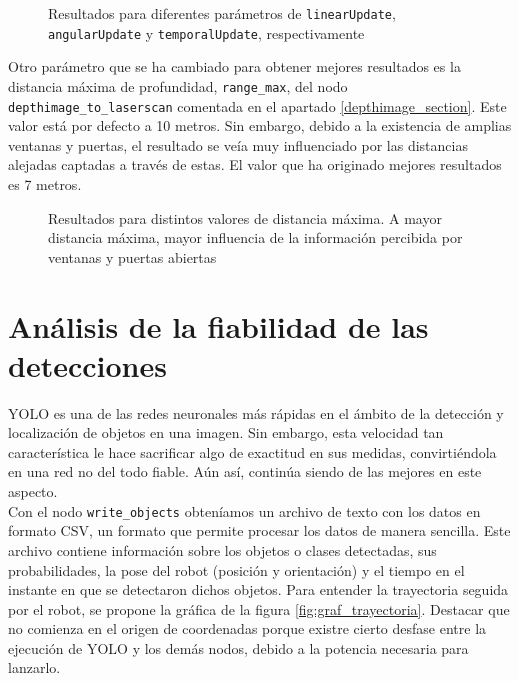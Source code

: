 \begin{figure}[H]
 \centering
 \caption{Resultados para diferentes parámetros de \texttt{linearUpdate}, \texttt{angularUpdate} y \texttt{temporalUpdate}, respectivamente}
 \label{fig:scans_params}
\end{figure}

Otro parámetro que se ha cambiado para obtener mejores resultados es la distancia máxima de profundidad, \texttt{range\_max}, del nodo \texttt{depthimage\_to\_laserscan} comentada en el apartado \ref{depthimage_section}. Este valor está por defecto a 10 metros. Sin embargo, debido a la existencia de amplias ventanas y puertas, el resultado se veía muy influenciado por las distancias alejadas captadas a través de estas. El valor que ha originado mejores resultados es 7 metros.\\

\begin{figure}[H]
 \centering
 \caption{Resultados para distintos valores de distancia máxima. A mayor distancia máxima, mayor influencia de la información percibida por ventanas y puertas abiertas}
 \label{fig:scans_range}
\end{figure}


\section{Análisis de la fiabilidad de las detecciones}

YOLO es una de las redes neuronales más rápidas en el ámbito de la detección y localización de objetos en una imagen. Sin embargo, esta velocidad tan característica le hace sacrificar algo de exactitud en sus medidas, convirtiéndola en una red no del todo fiable. Aún así, continúa siendo de las mejores en este aspecto.\\

Con el nodo \texttt{write\_objects} obteníamos un archivo de texto con los datos en formato CSV, un formato que permite procesar los datos de manera sencilla. Este archivo contiene información sobre los objetos o clases detectadas, sus probabilidades, la pose del robot (posición y orientación) y el tiempo en el instante en que se detectaron dichos objetos. Para entender la trayectoria seguida por el robot, se propone la gráfica de la figura \ref{fig:graf_trayectoria}. Destacar que no comienza en el origen de coordenadas porque existre cierto desfase entre la ejecución de YOLO y los demás nodos, debido a la potencia necesaria para lanzarlo.\\

